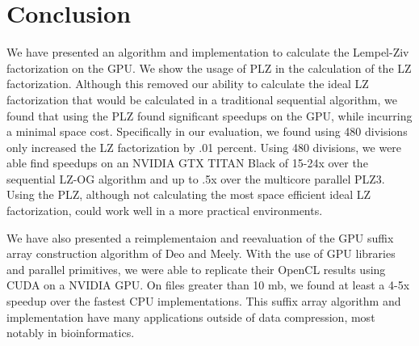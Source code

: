 \chapter{Conclusion}
\label{chap:conclusion}

We have presented an algorithm and implementation to calculate the Lempel-Ziv factorization on the GPU.
We show the usage of PLZ in the calculation of the LZ factorization.
Although this removed our ability to calculate the ideal LZ factorization that would be calculated in a traditional sequential algorithm, we found that using the PLZ found significant speedups on the GPU, while incurring a minimal space cost.
Specifically in our evaluation, we found using 480 divisions only increased the LZ factorization by .01 percent.
Using 480 divisions, we were able find speedups on an NVIDIA GTX TITAN Black of 15-24x over the sequential LZ-OG algorithm and up to .5x over the multicore parallel PLZ3.
Using the PLZ, although not calculating the most space efficient ideal LZ factorization, could work well in a more practical environments.

We have also presented a reimplementaion and reevaluation of the GPU suffix array construction algorithm of Deo and Meely\cite{Deo}.
With the use of GPU libraries and parallel primitives, we were able to replicate their OpenCL results using CUDA on a NVIDIA GPU.
On files greater than 10 mb, we found at least a 4-5x speedup over the fastest CPU implementations.
This suffix array algorithm and implementation have many applications outside of data compression, most notably in bioinformatics.
